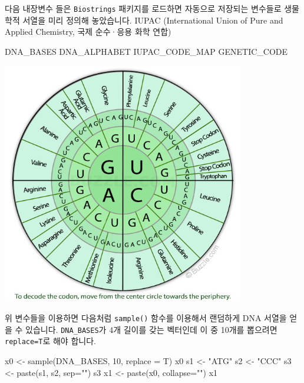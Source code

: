 \documentclass[
]{book}
\newenvironment{Shaded}{\begin{snugshade}}{\end{snugshade}}
\newcommand{\AttributeTok}[1]{\textcolor[rgb]{0.77,0.63,0.00}{#1}}
\newcommand{\DecValTok}[1]{\textcolor[rgb]{0.00,0.00,0.81}{#1}}
\newcommand{\FunctionTok}[1]{\textcolor[rgb]{0.00,0.00,0.00}{#1}}
\newcommand{\NormalTok}[1]{#1}
\newcommand{\OtherTok}[1]{\textcolor[rgb]{0.56,0.35,0.01}{#1}}
\newcommand{\StringTok}[1]{\textcolor[rgb]{0.31,0.60,0.02}{#1}}
\begin{document}
다음 내장변수 들은 \texttt{Biostrings} 패키지를 로드하면 자동으로 저장되는 변수들로 생물학적 서열을 미리 정의해 놓았습니다. IUPAC (International Union of Pure and Applied Chemistry, 국제 순수·응용 화학 연합)

\begin{Shaded}
\begin{Highlighting}[]
\NormalTok{DNA\_BASES}
\NormalTok{DNA\_ALPHABET}
\NormalTok{IUPAC\_CODE\_MAP}
\NormalTok{GENETIC\_CODE}
\end{Highlighting}
\end{Shaded}

\includegraphics[width=4.16667in,height=\textheight]{images/rna-codon-chart.jpg}

위 변수들을 이용하면 다음처럼 \texttt{sample()} 함수를 이용해서 랜덤하게 DNA 서열을 얻을 수 있습니다. \texttt{DNA\_BASES}가 4개 길이를 갖는 벡터인데 이 중 10개를 뽑으려면 \texttt{replace=T}로 해야 합니다.

\begin{Shaded}
\begin{Highlighting}[]
\NormalTok{x0 }\OtherTok{\textless{}{-}} \FunctionTok{sample}\NormalTok{(DNA\_BASES, }\DecValTok{10}\NormalTok{, }\AttributeTok{replace =}\NormalTok{ T)}
\NormalTok{x0}
\NormalTok{s1 }\OtherTok{\textless{}{-}} \StringTok{"ATG"}
\NormalTok{s2 }\OtherTok{\textless{}{-}} \StringTok{"CCC"}
\NormalTok{s3 }\OtherTok{\textless{}{-}} \FunctionTok{paste}\NormalTok{(s1, s2, }\AttributeTok{sep=}\StringTok{""}\NormalTok{)}
\NormalTok{s3}
\NormalTok{x1 }\OtherTok{\textless{}{-}} \FunctionTok{paste}\NormalTok{(x0, }\AttributeTok{collapse=}\StringTok{""}\NormalTok{)}
\NormalTok{x1}
\end{Highlighting}
\end{Shaded}
\end{document}
